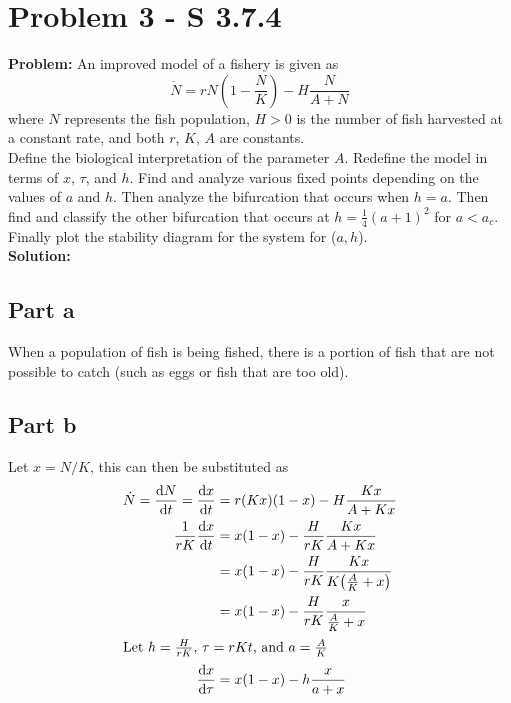 \documentclass[letter]{article}
\begin{document}
\section{Problem 3 - S 3.7.4}
\textbf{Problem:}
An improved model of a fishery is given as
\begin{equation}
	\dot{N} = r N (1 - \frac{N}{K}) - H \frac{N}{A + N}
\end{equation}
where $N$ represents the fish population, $H > 0$ is the number of fish harvested at a constant rate, and both $r$, $K$, $A$ are constants.\\
Define the biological interpretation of the parameter $A$. Redefine the model in terms of $x$, $\tau$, and $h$. Find and analyze various fixed points depending on the values of $a$ and $h$. Then analyze the bifurcation that occurs when $h=a$. Then find and classify the other bifurcation that occurs at $h = \frac{1}{4} (a+1)^2$ for $a<a_c$. Finally plot the stability diagram for the system for ($a,h$).\\

\noindent
\textbf{Solution:}
\subsection{Part a}
When a population of fish is being fished, there is a portion of fish that are not possible to catch (such as eggs or fish that are too old).

\subsection{Part b}
Let $x = N / K$, this can then be substituted as
\begin{align}
	\dot{N} = \dv{N}{t} = \dv{x}{t}	
	&= r (K x) \qty(1 - x) - H\frac{K x}{A + K x}\\
	\frac{1}{r K} \dv{x}{t}
	&= x \qty(1 - x) - \frac{H}{r K}\frac{K x}{A + K x}\\
	&= x \qty(1 - x) - \frac{H}{r K}\frac{K x}{K\qty(\frac{A}{K} + x)}\\
	&= x \qty(1 - x) - \frac{H}{r K}\frac{x}{\frac{A}{K} + x}\\
	\intertext{Let $h = \frac{H}{r K}$, $\tau = r K t$, and $a = \frac{A}{K}$}
	\dv{x}{\tau} &= x (1 - x) - h \frac{x}{a + x}
\end{align}

\newpage
\end{document}
